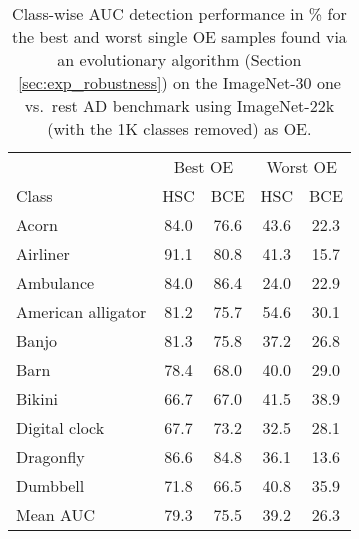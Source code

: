 \documentclass[10pt]{article} \usepackage[accepted]{stylefiles/tmlr}
\begin{document}
\begin{table*}[th]
    \caption{Class-wise AUC detection performance in \% for the best and worst single OE samples found via an evolutionary algorithm (Section \ref{sec:exp_robustness}) on the ImageNet-30 one vs.~rest AD benchmark using ImageNet-22k (with the 1K classes removed) as OE.  } 
    \label{tab:evolve_classwise_imagenet_plain}
    \vspace{0.5em}
    \centering\small
    \begin{tabular}{lcccc} 
\toprule 
 & \multicolumn{2}{c|}{Best OE} & \multicolumn{2}{c}{Worst OE} \\ 
Class & HSC & \multicolumn{1}{c|}{BCE} & HSC & \multicolumn{1}{c}{BCE} \\ 
\midrule 
Acorn & 84.0 & \multicolumn{1}{c|}{76.6} & 43.6 & \multicolumn{1}{c}{22.3} \\ 
Airliner & 91.1 & \multicolumn{1}{c|}{80.8} & 41.3 & \multicolumn{1}{c}{15.7} \\ 
Ambulance & 84.0 & \multicolumn{1}{c|}{86.4} & 24.0 & \multicolumn{1}{c}{22.9} \\ 
American alligator & 81.2 & \multicolumn{1}{c|}{75.7} & 54.6 & \multicolumn{1}{c}{30.1} \\ 
Banjo & 81.3 & \multicolumn{1}{c|}{75.8} & 37.2 & \multicolumn{1}{c}{26.8} \\ 
Barn & 78.4 & \multicolumn{1}{c|}{68.0} & 40.0 & \multicolumn{1}{c}{29.0} \\ 
Bikini & 66.7 & \multicolumn{1}{c|}{67.0} & 41.5 & \multicolumn{1}{c}{38.9} \\ 
Digital clock & 67.7 & \multicolumn{1}{c|}{73.2} & 32.5 & \multicolumn{1}{c}{28.1} \\ 
Dragonfly & 86.6 & \multicolumn{1}{c|}{84.8} & 36.1 & \multicolumn{1}{c}{13.6} \\ 
Dumbbell & 71.8 & \multicolumn{1}{c|}{66.5} & 40.8 & \multicolumn{1}{c}{35.9} \\ 
\midrule 
Mean AUC & 79.3 & \multicolumn{1}{c|}{75.5} & 39.2 & \multicolumn{1}{c}{26.3} \\ 
\bottomrule 
\end{tabular}  \end{table*}
\end{document}
